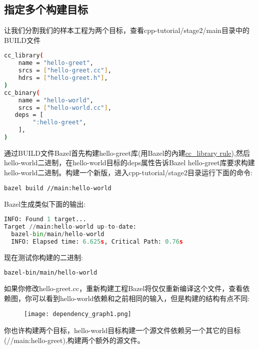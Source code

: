 \subsection{指定多个构建目标}
让我们分割我们的样本工程为两个目标，查看cpp-tutorial/stage2/main目录中的BUILD文件
\begin{lstlisting}[language=Bash]
cc_library(
    name = "hello-greet",
    srcs = ["hello-greet.cc"],
    hdrs = ["hello-greet.h"],
)
cc_binary(
    name = "hello-world",
    srcs = ["hello-world.cc"],
   deps = [
        ":hello-greet",
    ],
)
\end{lstlisting}
通过BUILD文件Bazel首先构建hello-greet库(用Bazel的內建\href{https://docs.bazel.build/versions/master/be/c-cpp.html#cc_library}{cc\_library rule}),然后hello-world二进制，在hello-world目标的deps属性告诉Bazel hello-greet库要求构建hello-world二进制。构建一个新版，进入cpp-tutorial/stage2目录运行下面的命令:
\begin{lstlisting}[language=Bash]
bazel build //main:hello-world
\end{lstlisting}
Bazel生成类似下面的输出:
\begin{lstlisting}[language=Python]
INFO: Found 1 target...
Target //main:hello-world up-to-date:
  bazel-bin/main/hello-world
  INFO: Elapsed time: 6.625s, Critical Path: 0.76s
\end{lstlisting}
现在测试你构建的二进制:
\begin{lstlisting}[language=Bash]
bazel-bin/main/hello-world
\end{lstlisting}
如果你修改hello-greet.cc，重新构建工程Bazel将仅仅重新编译这个文件，查看依赖图，你可以看到hello-world依赖和之前相同的输入，但是构建的结构有点不同:
\begin{figure}[h]
	\texttt{[image: dependency\_graph1.png]}
\end{figure}
你也许构建两个目标，hello-world目标构建一个源文件依赖另一个其它的目标(//main:hello-greet),构建两个额外的源文件。
